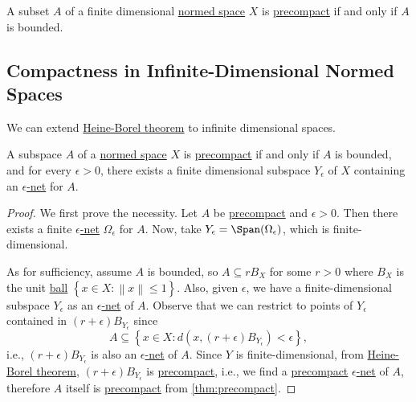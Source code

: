 \begin{theorem}\label{thm:Heine-Borel}
	A subset \(A\) of a finite dimensional \hyperref[def:normed-vector-space]{normed space} \(X\) is \hyperref[def:precompact]{precompact} if and only if \(A\) is bounded.
\end{theorem}

\subsection{Compactness in Infinite-Dimensional Normed Spaces}
We can extend \hyperref[thm:Heine-Borel]{Heine-Borel theorem} to infinite dimensional spaces.

\begin{lemma}\label{lma:appx-by-finite-dim-subspace}
	A subspace \(A\) of a \hyperref[def:normed-vector-space]{normed space} \(X\) is \hyperref[def:precompact]{precompact} if and only if \(A\) is bounded, and for every \(\epsilon > 0\), there exists a finite dimensional subspace \(Y_{\epsilon}\) of \(X\) containing an \hyperref[def:eps-net]{\(\epsilon \)-net} for \(A\).
\end{lemma}
\begin{proof}
	We first prove the necessity. Let \(A\) be \hyperref[def:precompact]{precompact} and \(\epsilon >0\). Then there exists a finite \hyperref[def:eps-net]{\(\epsilon \)-net} \(\Omega _\epsilon\) for \(A\). Now, take \(Y_{\epsilon } = \Span(\Omega _\epsilon )\), which is finite-dimensional.

	As for sufficiency, assume \(A\) is bounded, so \(A \subseteq r B_X\) for some \(r > 0\) where \(B_X\) is the unit \hyperref[def:ball]{ball} \(\left\{ x\in X\colon \left\lVert x\right\rVert \leq 1 \right\} \). Also, given \(\epsilon \), we have a finite-dimensional subspace \(Y_{\epsilon }\) as an \hyperref[def:eps-net]{\(\epsilon \)-net} of \(A\). Observe that we can restrict to points of \(Y _\epsilon \) contained in \((r+\epsilon )B_{Y_{\epsilon } }\) since
	\[
		A \subseteq \left\{ x\in X\colon d(x, (r + \epsilon )B_{Y_{\epsilon } }) < \epsilon \right\},
	\]
	i.e., \((r+\epsilon )B_{Y_{\epsilon } }\) is also an \hyperref[def:eps-net]{\(\epsilon \)-net} of \(A\). Since \(Y\) is finite-dimensional, from \hyperref[thm:Heine-Borel]{Heine-Borel theorem}, \((r+\epsilon )B_{Y_{\epsilon } }\) is \hyperref[def:precompact]{precompact}, i.e., we find a \hyperref[def:precompact]{precompact}  \hyperref[def:eps-net]{\(\epsilon \)-net} of \(A\), therefore \(A\) itself is \hyperref[def:precompact]{precompact} from \autoref{thm:precompact}.
\end{proof}

